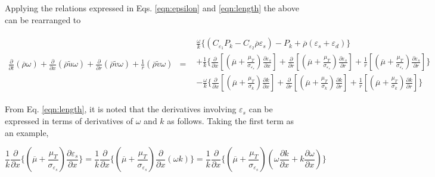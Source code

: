 	Applying the relations expressed in Eqs. \ref{eqn:epsilon} and \ref{eqn:length} the above can be rearranged to

\begin{equation}
	\begin{array}{ccc}
	 \frac{\partial}{\partial t}(\overline{\rho}\omega)
	+ \frac{\partial}{\partial x}(\overline{\rho}\tilde u\omega)+ \frac{\partial}{\partial r}(\overline{\rho}\tilde v\omega)
	+ \frac{1}{r}(\overline{\rho}\tilde v\omega) & = &
	   \begin{array}{c}
		\frac{\omega}{k}\Big\{(C_{\varepsilon_1}P_k - C_{\varepsilon_2}\overline{\rho}\varepsilon_s)
		- P_k + \overline{\rho}(\varepsilon_s + \varepsilon_d) \Big\} \\
		+ \frac{1}{k}\Big\{
		\frac{\partial}{\partial x}[(\overline{\mu} + \frac{\mu_T}{\sigma_{\varepsilon_s}})
		\frac{\partial \varepsilon_s}{\partial x}] 
		+ \frac{\partial}{\partial r}[(\overline{\mu} + \frac{\mu_T}{\sigma_{\varepsilon_s}})
		\frac{\partial \varepsilon_s}{\partial r}]
		+ \frac{1}{r}[(\overline{\mu} + \frac{\mu_T}{\sigma_{\varepsilon_s}})
		\frac{\partial \varepsilon_s}{\partial r}]\Big\} 
		\\
		- \frac{\omega}{k}\Big\{\frac{\partial}{\partial x}[(\overline{\mu} + \frac{\mu_T}{\sigma_k})
		\frac{\partial k}{\partial x}] 
		+ \frac{\partial}{\partial r}[(\overline{\mu} + \frac{\mu_T}{\sigma_k})
		\frac{\partial k}{\partial r}]
		+ \frac{1}{r}[(\overline{\mu} + \frac{\mu_T}{\sigma_k})
		\frac{\partial k}{\partial r}] 
		\Big\}
	   \end{array}
	\end{array}
\label{eqn:diss2}
\end{equation}

	From Eq. \ref{eqn:length}, it is noted that the derivatives involving $\varepsilon_s$ can be expressed in terms
of derivatives of $\omega$ and $k$ as follows.  Taking the first term as an example,

\begin{displaymath}
	\frac{1}{k}\frac{\partial}{\partial x}\Big\{(\overline{\mu} + \frac{\mu_T}{\sigma_{\varepsilon_s}})
	\frac{\partial \varepsilon_s}{\partial x}\Big\} = \frac{1}{k}\frac{\partial}{\partial x}\Big\{(\overline{\mu} 
	+ \frac{\mu_T}{\sigma_{\varepsilon_s}})\frac{\partial}{\partial x}(\omega k)\Big\} = \frac{1}{k} 
	\frac{\partial}{\partial x}\Big\{(\overline{\mu} + \frac{\mu_T}{\sigma_{\varepsilon_s}})
	(\omega \frac{\partial k}{\partial x} + k \frac{\partial \omega}{\partial x})\Big\}
\end{displaymath}

